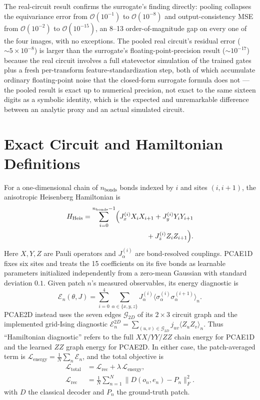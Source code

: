 \documentclass[11pt]{article}
\begin{document}
The real-circuit result confirms the surrogate's finding directly: pooling collapses the equivariance error from $\mathcal{O}(10^{-1})$ to $\mathcal{O}(10^{-8})$ and output-consistency MSE from $\mathcal{O}(10^{-2})$ to $\mathcal{O}(10^{-15})$, an 8--13 order-of-magnitude gap on every one of the four images, with no exceptions. The pooled real circuit's residual error ($\sim\!5\times10^{-8}$) is larger than the surrogate's floating-point-precision result ($\sim\!10^{-17}$) because the real circuit involves a full statevector simulation of the trained gates plus a fresh per-transform feature-standardization step, both of which accumulate ordinary floating-point noise that the closed-form surrogate formula does not --- the pooled result is exact up to numerical precision, not exact to the same sixteen digits as a symbolic identity, which is the expected and unremarkable difference between an analytic proxy and an actual simulated circuit.

\section{Exact Circuit and Hamiltonian Definitions}
\label{sec:supp_exact_circuits}
For a one-dimensional chain of $n_{\text{bonds}}$ bonds indexed by $i$ and sites $(i,i+1)$, the anisotropic Heisenberg Hamiltonian is
\begin{align}
H_{\text{Heis}}=\sum_{i=0}^{n_{\text{bonds}}-1}\Bigl(
J_x^{(i)}X_iX_{i+1}+J_y^{(i)}Y_iY_{i+1}\nonumber\\
{}+J_z^{(i)}Z_iZ_{i+1}\Bigr).
\end{align}
Here $X,Y,Z$ are Pauli operators and $J_\alpha^{(i)}$ are bond-resolved couplings. PCAE1D fixes six sites and treats the 15 coefficients on its five bonds as learnable parameters initialized independently from a zero-mean Gaussian with standard deviation $0.1$. Given patch $n$'s measured observables, its energy diagnostic is
\begin{equation}
\mathcal{E}_n(\theta,J) = \sum_{i=0}^{4}\sum_{\alpha\in\{x,y,z\}} J_\alpha^{(i)}\langle\sigma_\alpha^{(i)}\sigma_\alpha^{(i+1)}\rangle_n.
\end{equation}
PCAE2D instead uses the seven edges $\mathcal{G}_{2D}$ of its $2\times3$ circuit graph and the implemented grid-Ising diagnostic $\mathcal{E}^{2D}_n=\sum_{(u,v)\in\mathcal{G}_{2D}}j_{uv}\langle Z_uZ_v\rangle_n$. Thus ``Hamiltonian diagnostic'' refers to the full $XX/YY/ZZ$ chain energy for PCAE1D and the learned $ZZ$ graph energy for PCAE2D. In either case, the patch-averaged term is $\mathcal{L}_{\text{energy}}=\frac{1}{N}\sum_n \mathcal{E}_n$, and the total objective is
\begin{align}
\mathcal{L}_{\text{total}}&=\mathcal{L}_{\text{rec}}
+\lambda\,\mathcal{L}_{\text{energy}},\\
\mathcal{L}_{\text{rec}}&=\frac{1}{N}\sum_{n=1}^{N}
\bigl\|D(o_n,e_n)-P_n\bigr\|_F^2.
\end{align}
with $D$ the classical decoder and $P_n$ the ground-truth patch.
\end{document}
